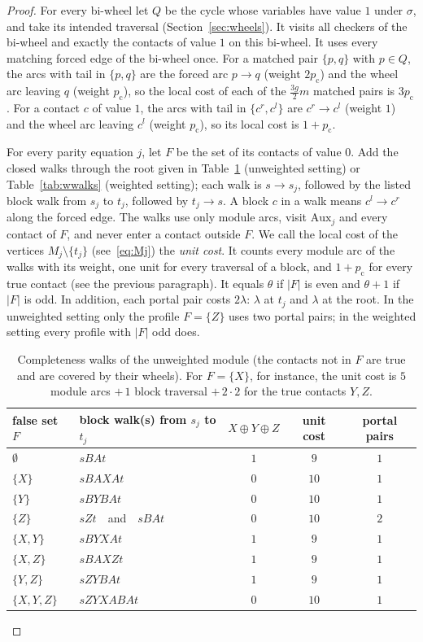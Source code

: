 \documentclass[11pt]{amsart}
\theoremstyle{definition}
\theoremstyle{remark}
\numberwithin{equation}{section}
\newcommand{\Aux}{\mathrm{Aux}}
\newcommand{\pc}{p_{\mathrm{c}}}
\begin{document}
\begin{proof}
For every bi-wheel let $Q$ be the cycle whose variables have value $1$ under $\sigma$, and take its intended traversal (Section~\ref{sec:wheels}). It visits all checkers of the bi-wheel and exactly the contacts of value $1$ on this bi-wheel. It uses every matching forced edge of the bi-wheel once. For a matched pair $\{p,q\}$ with $p\in Q$, the arcs with tail in $\{p,q\}$ are the forced arc $p\to q$ (weight $2\pc$) and the wheel arc leaving $q$ (weight $\pc$), so the local cost of each of the $\frac{3g}{2}m$ matched pairs is $3\pc$. For a contact $c$ of value $1$, the arcs with tail in $\{c^r,c^l\}$ are $c^r\to c^l$ (weight $1$) and the wheel arc leaving $c^l$ (weight $\pc$), so its local cost is $1+\pc$.

For every parity equation $j$, let $F$ be the set of its contacts of value $0$. Add the closed walks through the root given in Table~\ref{tab:walks} (unweighted setting) or Table~\ref{tab:wwalks} (weighted setting); each walk is $s\to s_j$, followed by the listed block walk from $s_j$ to $t_j$, followed by $t_j\to s$. A block $c$ in a walk means $c^l\to c^r$ along the forced edge. The walks use only module arcs, visit $\Aux_j$ and every contact of $F$, and never enter a contact outside $F$. We call the local cost of the vertices $M_j\setminus\{t_j\}$ (see~\eqref{eq:Mj}) the \emph{unit cost}. It counts every module arc of the walks with its weight, one unit for every traversal of a block, and $1+\pc$ for every true contact (see the previous paragraph). It equals $\theta$ if $|F|$ is even and $\theta+1$ if $|F|$ is odd. In addition, each portal pair costs $2\lambda$: $\lambda$ at $t_j$ and $\lambda$ at the root. In the unweighted setting only the profile $F=\{Z\}$ uses two portal pairs; in the weighted setting every profile with $|F|$ odd does.

\begin{table}[ht]
\centering
\begin{tabular}{@{}llccc@{}}
\toprule
false set $F$ & block walk(s) from $s_j$ to $t_j$ & $X\oplus Y\oplus Z$ & unit cost & portal pairs\\
\midrule
$\emptyset$ & $sBAt$ & $1$ & $9$ & $1$\\
$\{X\}$ & $sBAXAt$ & $0$ & $10$ & $1$\\
$\{Y\}$ & $sBYBAt$ & $0$ & $10$ & $1$\\
$\{Z\}$ & $sZt$\ \ and\ \ $sBAt$ & $0$ & $10$ & $2$\\
$\{X,Y\}$ & $sBYXAt$ & $1$ & $9$ & $1$\\
$\{X,Z\}$ & $sBAXZt$ & $1$ & $9$ & $1$\\
$\{Y,Z\}$ & $sZYBAt$ & $1$ & $9$ & $1$\\
$\{X,Y,Z\}$ & $sZYXABAt$ & $0$ & $10$ & $1$\\
\bottomrule
\end{tabular}
\medskip
\caption{Completeness walks of the unweighted module (the contacts not in $F$ are true and are covered by their wheels). For $F=\{X\}$, for instance, the unit cost is $5$ module arcs $+\,1$ block traversal $+\,2\cdot2$ for the true contacts $Y,Z$.}
\label{tab:walks}
\end{table}


\end{proof}
\end{document}
